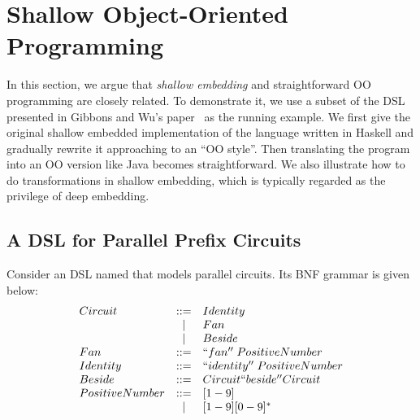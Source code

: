 \section{Shallow Object-Oriented Programming}\label{sec:oo}

\begin{comment}
Weixin writes this part.

Argue that shallow embeddings and straightforward OO 
programs are essentially the same thing. 

Start from a simple shallow DSL in Haskell, 
and iterate throught it until you reach a form 
that looks like an OO program.

Show how todo transformations in Shallow embeddings
using the insight of how to do transformations in OO
programs.

Show the correponding Java programs and the Java program 
with transformation that we can port back to Haskell.
\end{comment}

In this section, we argue that \emph{shallow embedding} and straightforward OO
programming are closely related. To demonstrate it, we use a subset
of the DSL presented in Gibbons and Wu's paper~\cite{gibbons2014folding} as the running example.
We first give the original shallow embedded implementation of the language
written in Haskell
and gradually rewrite it approaching to an ``OO style''.
Then translating the program into an OO version like Java becomes straightforward.
We also illustrate how to do transformations in shallow embedding, which is typically regarded as the privilege of deep embedding.

\subsection{A DSL for Parallel Prefix Circuits}
Consider an DSL named \dsl that models parallel circuits.
Its BNF grammar is given below:
$$
\begin{array}{lcl}
Circuit & ::= & Identity \\
 & \mid & Fan \\
 & \mid & Beside \\
Fan & ::= & ``fan''\; PositiveNumber \\
Identity & ::= & ``identity''\;  PositiveNumber \\
Beside & ::= & Circuit ``beside'' Circuit \\
PositiveNumber & ::= & [1-9] \\
     & \mid & [1-9][0-9]^* \\
\end{array}
$$

